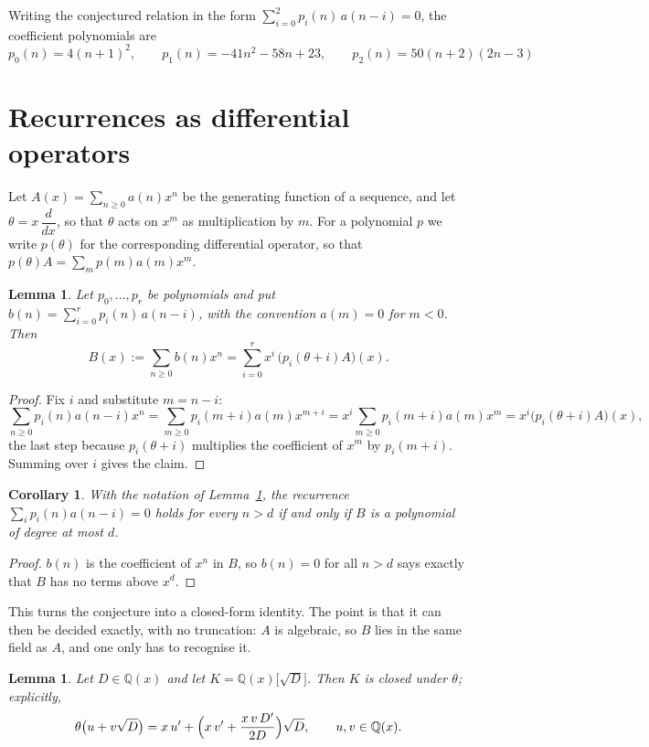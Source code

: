 \documentclass[11pt,a4paper]{article}
\theoremstyle{plain}
\newtheorem{lemma}[theorem]{Lemma}
\newtheorem{corollary}[theorem]{Corollary}
\theoremstyle{definition}
\begin{document}
Writing the conjectured relation in the form $\sum_{i=0}^{2}p_{i}(n)\,a(n-i)=0$,
the coefficient polynomials are
\[
p_{0}(n)=4 \left(n + 1\right)^{2},\qquad p_{1}(n)=- 41 n^{2} - 58 n + 23,\qquad p_{2}(n)=50 \left(n + 2\right) \left(2 n - 3\right)
\]

\section{Recurrences as differential operators}

Let $A(x)=\sum_{n\ge0}a(n)x^{n}$ be the generating function of a sequence, and let
$\theta=x\,\dfrac{d}{dx}$, so that $\theta$ acts on $x^{m}$ as multiplication by $m$. For a
polynomial $p$ we write $p(\theta)$ for the corresponding differential operator, so that
$p(\theta)A=\sum_{m}p(m)a(m)x^{m}$.

\begin{lemma}\label{lem:transfer}
Let $p_{0},\dots,p_{r}$ be polynomials and put $b(n)=\sum_{i=0}^{r}p_{i}(n)\,a(n-i)$, with
the convention $a(m)=0$ for $m<0$. Then
\[
B(x):=\sum_{n\ge0}b(n)x^{n}=\sum_{i=0}^{r}x^{i}\,\bigl(p_{i}(\theta+i)A\bigr)(x).
\]
\end{lemma}

\begin{proof}
Fix $i$ and substitute $m=n-i$:
\[
\sum_{n\ge0}p_{i}(n)a(n-i)x^{n}=\sum_{m\ge0}p_{i}(m+i)a(m)x^{m+i}
=x^{i}\sum_{m\ge0}p_{i}(m+i)a(m)x^{m}=x^{i}\bigl(p_{i}(\theta+i)A\bigr)(x),
\]
the last step because $p_{i}(\theta+i)$ multiplies the coefficient of $x^{m}$ by
$p_{i}(m+i)$. Summing over $i$ gives the claim.
\end{proof}

\begin{corollary}\label{cor:criterion}
With the notation of Lemma~\ref{lem:transfer}, the recurrence
$\sum_{i}p_{i}(n)a(n-i)=0$ holds for every $n>d$ if and only if $B$ is a polynomial of
degree at most $d$.
\end{corollary}

\begin{proof}
$b(n)$ is the coefficient of $x^{n}$ in $B$, so $b(n)=0$ for all $n>d$ says exactly that
$B$ has no terms above $x^{d}$.
\end{proof}

This turns the conjecture into a closed-form identity. The point is that it can then be
decided exactly, with no truncation: $A$ is algebraic, so $B$ lies in the same field as
$A$, and one only has to recognise it.

\begin{lemma}\label{lem:field}
Let $D\in\mathbb{Q}(x)$ and let $K=\mathbb{Q}(x)\bigl[\sqrt{D}\bigr]$. Then $K$ is closed
under $\theta$; explicitly,
\[
\theta\bigl(u+v\sqrt{D}\bigr)=x\,u'+\Bigl(x\,v'+\frac{x\,v\,D'}{2D}\Bigr)\sqrt{D},
\qquad u,v\in\mathbb{Q}(x).
\]
\end{lemma}
\end{document}
